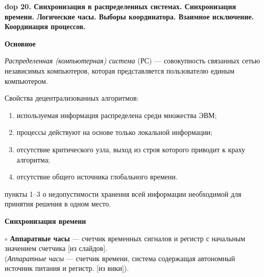 \newcommand{\notsure}[1]{(видимо: #1)}
\newcommand{\aboba}[2]{\textbf{\LARGE dop #1. #2}}
\newcommand{\multicom}[1]{}
\newcommand{\lulz}[1]{}
\newcommand{\wantsayInstead}[1]{}

\textbf{\LARGE dop 20. Синхронизация  в  распределенных  системах.  Синхронизация  времени.  Логические  часы.  Выборы координатора. Взаимное исключение. Координация процессов.}

\bigbreak

\centerline{\textbf{Основное}}

\textit{Распределенная (компьютерная) система} (РС) --– совокупность связанных
сетью независимых компьютеров, которая представляется
пользователю единым компьютером. 


Свойства децентрализованных алгоритмов:
\vspace{-0.7em}
\begin{enumerate}
\setlength\itemsep{-0.4em}
\item используемая информация распределена среди множества ЭВМ;
\item процессы действуют на основе только локальной информации;
\item отсутствие критического узла, выход из строя которого приводит к краху алгоритма;
\item отсутствие общего источника глобального времени.
\end{enumerate}
пункты 1--3 о недопустимости хранения всей информации необходимой для принятия решения в одном место.


\centerline{\textbf{Синхронизация времени}}

$\circ$
\textbf{Аппаратные часы} --- счетчик временных сигналов и регистр с начальным значением счетчика [из слайдов].
\\
(\textit{Аппаратные часы} --- счетчик времени, система содержащая автономный источник питания и регистр. [из вики]).

